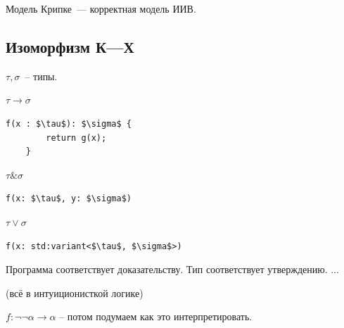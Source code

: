 \begin{theorem}
    Модель Крипке~--- корректная модель ИИВ.
\end{theorem}

\subsection{Изоморфизм К---Х}

\begin{statement}
    $\tau, \sigma$~-- типы. 
    
    $\tau \to \sigma$
    \begin{lstlisting}[mathescape=true]
    f(x : $\tau$): $\sigma$ {
        return g(x);
    }\end{lstlisting}

    $\tau \& \sigma$
    \begin{lstlisting}[mathescape=true]
    f(x: $\tau$, y: $\sigma$)\end{lstlisting}

    $\tau \vee \sigma$
    \begin{lstlisting}[mathescape=true]
    f(x: std:variant<$\tau$, $\sigma$>)\end{lstlisting}

\end{statement}

\begin{definition}

    Программа соответствует доказательству. Тип соответствует утверждению. ...

    (всё в интуиционисткой логике)
\end{definition}

\begin{note}
    $f: \neg\neg \alpha \to \alpha $ -- потом подумаем как это интерпретировать.
\end{note}

\endinput